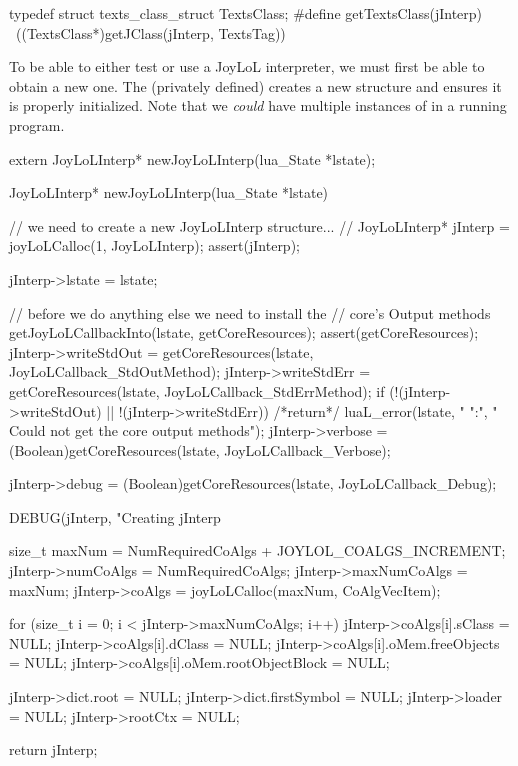 typedef struct texts_class_struct TextsClass;
#define getTextsClass(jInterp)                              \
  ((TextsClass*)getJClass(jInterp, TextsTag))
\stopCHeader

\startTestSuite[newJoyLoLInterp]

To be able to either test or use a JoyLoL interpreter, we must first be 
able to obtain a new one. The (privately defined) \type{newJoyLoLInterp} 
creates a new  structure and ensures it is properly 
initialized. Note that we \emph{could} have multiple instances of 
\type{JoyLoLInterp} in a running program. 

\startCHeader
extern JoyLoLInterp* newJoyLoLInterp(lua_State *lstate);
\stopCHeader
{}

\startCCode
JoyLoLInterp* newJoyLoLInterp(lua_State *lstate) {
  // we need to create a new JoyLoLInterp structure...
  //
  JoyLoLInterp* jInterp = joyLoLCalloc(1, JoyLoLInterp);
  assert(jInterp);

  jInterp->lstate = lstate;
  
  // before we do anything else we need to install the
  // core's Output methods
  getJoyLoLCallbackInto(lstate, getCoreResources);
  assert(getCoreResources);
  jInterp->writeStdOut =
    getCoreResources(lstate, JoyLoLCallback_StdOutMethod);
  jInterp->writeStdErr =
    getCoreResources(lstate, JoyLoLCallback_StdErrMethod);
  if (!(jInterp->writeStdOut) || !(jInterp->writeStdErr)) {
    /*return*/ luaL_error(lstate, "%
      "\nERROR:\n",
      "  Could not get the core output methods\n");
  }
  jInterp->verbose = 
    (Boolean)getCoreResources(lstate, JoyLoLCallback_Verbose);
    
  jInterp->debug = 
    (Boolean)getCoreResources(lstate, JoyLoLCallback_Debug);

  DEBUG(jInterp, "Creating jInterp %
    
  size_t maxNum =
    NumRequiredCoAlgs + JOYLOL_COALGS_INCREMENT;
  jInterp->numCoAlgs    = NumRequiredCoAlgs;
  jInterp->maxNumCoAlgs = maxNum;
  jInterp->coAlgs    = joyLoLCalloc(maxNum, CoAlgVecItem);
  
  for (size_t i = 0; i < jInterp->maxNumCoAlgs; i++) {
    jInterp->coAlgs[i].sClass               = NULL;
    jInterp->coAlgs[i].dClass               = NULL;
    jInterp->coAlgs[i].oMem.freeObjects     = NULL;
    jInterp->coAlgs[i].oMem.rootObjectBlock = NULL; 
  }
  
  jInterp->dict.root        = NULL;
  jInterp->dict.firstSymbol = NULL;
  jInterp->loader           = NULL;
  jInterp->rootCtx          = NULL;
    
  return jInterp;
}
\stopCCode

